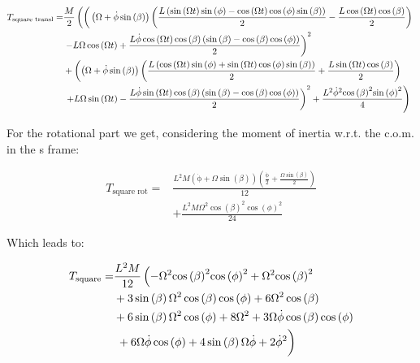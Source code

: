 \begin{equation}
    \begin{split}
        T_\text{square transl} = &\frac{M}{2}\left(\left(\vphantom{\int}\left(\Omega +\mathrm{\dot\phi}\sin\left(\beta \right)\right)\left(\frac{L\left(\sin\left(\Omega t\right)\sin\left(\phi \right)-\cos\left(\Omega t\right)\cos\left(\phi \right)\sin\left(\beta \right)\right)}{2}-\frac{L\cos\left(\Omega t\right)\cos\left(\beta \right)}{2}\right)\right.\right.\\
        &\left.-L\Omega \cos\left(\Omega t\right)+\frac{L\mathrm{\dot\phi}\cos\left(\Omega t\right)\cos\left(\beta \right)\left(\sin\left(\beta \right)-\cos\left(\beta \right)\cos\left(\phi \right)\right)}{2}\right)^2\\
        &+\left(\left(\Omega +\mathrm{\dot\phi}\sin\left(\beta \right)\right)\left(\frac{L\left(\cos\left(\Omega t\right)\sin\left(\phi \right)+\sin\left(\Omega t\right)\cos\left(\phi \right)\sin\left(\beta \right)\right)}{2}+\frac{L\sin\left(\Omega t\right)\cos\left(\beta \right)}{2}\right)\right.\\
        &\left.\left.+L\Omega \sin\left(\Omega t\right)-\frac{L\mathrm{\dot\phi}\sin\left(\Omega t\right)\cos\left(\beta \right)\left(\sin\left(\beta \right)-\cos\left(\beta \right)\cos\left(\phi \right)\right)}{2}\right)^2+\frac{L^2{\mathrm{\dot\phi}}^2{\cos\left(\beta \right)}^2{\sin\left(\phi \right)}^2}{4}\right)
    \end{split}
\end{equation}

For the rotational part we get, considering the moment of inertia w.r.t. the c.o.m. in the s frame:

\begin{equation}
    \begin{split}
        T_\text{square rot} = &\frac{L^2M\left(\mathrm{\dot\phi}+\Omega \sin\left(\beta \right)\right)\left(\frac{\mathrm{\dot\phi}}{2}+\frac{\Omega \sin\left(\beta \right)}{2}\right)}{12}\\
        &+\frac{L^2M\Omega ^2{\cos\left(\beta \right)}^2{\cos\left(\phi \right)}^2}{24}
    \end{split}
\end{equation}

Which leads to:

\begin{equation}
    \begin{split}
        T_\text{square} = &\frac{L^2M}{12}\left(-\Omega ^2{\cos\left(\beta \right)}^2{\cos\left(\phi \right)}^2+\Omega ^2{\cos\left(\beta \right)}^2\right.\\
        &+3\sin\left(\beta \right)\Omega ^2\cos\left(\beta \right)\cos\left(\phi \right)+6\Omega ^2\cos\left(\beta \right)\\
        &+6\sin\left(\beta \right)\Omega ^2\cos\left(\phi \right)+8\Omega ^2+3\Omega \mathrm{\dot\phi}\cos\left(\beta \right)\cos\left(\phi \right)\\
        &\left.\vphantom{\int}+6\Omega \mathrm{\dot\phi}\cos\left(\phi \right)+4\sin\left(\beta \right)\Omega \mathrm{\dot\phi}+2{\mathrm{\dot\phi}}^2\right)
    \end{split}
\end{equation}


